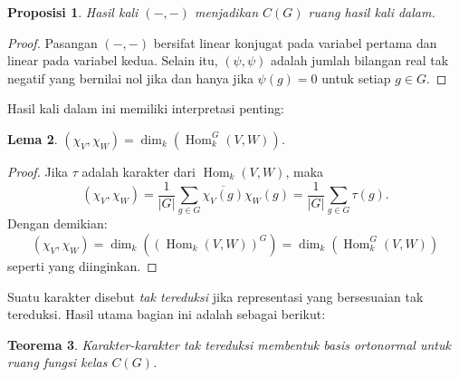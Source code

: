 \documentclass[12pt]{article}
\theoremstyle{plain}
\newtheorem{theorem}{Teorema}[section]
\newtheorem{lemma}[theorem]{Lema}
\newtheorem{proposition}[theorem]{Proposisi}
\theoremstyle{definition}
\theoremstyle{remark}
\numberwithin{equation}{section}
\begin{document}
\begin{proposition}
Hasil kali $(-,-)$ menjadikan $C(G)$ ruang hasil kali dalam.
\end{proposition}

\begin{proof}
Pasangan $(-,-)$ bersifat linear konjugat pada variabel pertama dan linear pada
variabel kedua. Selain itu, $(\psi,\psi)$ adalah jumlah bilangan real tak negatif
yang bernilai nol jika dan hanya jika $\psi(g)=0$ untuk setiap $g \in G$.
\end{proof}


Hasil kali dalam ini memiliki interpretasi penting:

\begin{lemma}
$\displaystyle
(\chi_V, \chi_W) = \dim_k\left( \operatorname{Hom}^G_k\left(V,
W\right)\right)$.
\end{lemma}

\begin{proof}
Jika $\tau$ adalah karakter dari $\operatorname{Hom}_k(V,W)$, maka
\[ ( \chi_V , \chi_W ) = \frac{1}{|G|}
\sum_{g \in G} \overline{\chi_V(g)} \chi_W(g)
= \frac{1}{|G|} \sum_{g \in G} \tau(g) .
\]
Dengan demikian:
\[ ( \chi_V , \chi_W ) =
\dim_k\left(\left( \operatorname{Hom}_k\left(V,W\right) \right)^G\right) =
\dim_k( \operatorname{Hom}^G_k(V,W) ) \]
seperti yang diinginkan.
\end{proof}

Suatu karakter disebut \emph{tak tereduksi} jika representasi yang bersesuaian
tak tereduksi.
Hasil utama bagian ini adalah sebagai berikut:

\begin{theorem}
Karakter-karakter tak tereduksi membentuk basis ortonormal untuk ruang
fungsi kelas $C(G)$.
\end{theorem}
\end{document}
